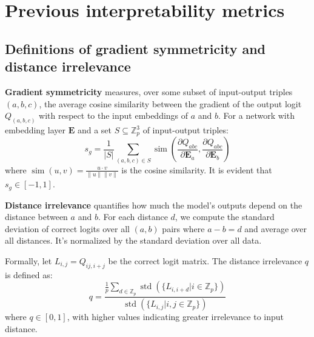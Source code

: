 \documentclass{article} %
\theoremstyle{plain}
\theoremstyle{definition}
\newtheorem{empirical fact}[theorem]{Empirical Fact}
\begin{document}
\section{Previous interpretability metrics \citep{zhong2023the}}\label{app:prev-metrics}

\subsection{Definitions of gradient symmetricity and distance irrelevance}

\textbf{Gradient symmetricity} measures, over some subset of input-output triples $(a,b,c)$, the average cosine similarity between the gradient of the output logit $Q_{(a,b,c)}$ with respect to the input embeddings of $a$ and $b$. For a network with embedding layer $\mathbf{E}$ and a set $S\subseteq \mathbb{Z}_p^3$ of input-output triples:
\[
    s_g = \frac{1}{|S|} \sum_{(a,b,c)\in S}\operatorname{sim}\left(\frac{\partial Q_{abc}}{\partial \mathbf{E}_a}, \frac{\partial Q_{abc}}{\partial\mathbf{E}_b}\right)
\]
where $\operatorname{sim}(u,v)=\frac{u\cdot v}{\| u \| \| v \|}$ is the cosine similarity. It is evident that $s_g\in [-1, 1]$. 

\textbf{Distance irrelevance} quantifies how much the model’s outputs depend on the distance between $a$ and $b$. For each distance $d$, we compute the standard deviation of correct logits over all $(a,b)$ pairs where $a-b=d$ and average over all distances. It's normalized by the standard deviation over all data.

Formally, let $L_{i,j}=Q_{ij, i+j}$ be the correct logit matrix. The distance irrelevance $q$ is defined as:
\[
    q= \frac{\frac{1}{p}\sum_{d\in \mathbb{Z}_p}\operatorname{std}(\{L_{i, i+d}|i\in \mathbb{Z}_p\})}{\operatorname{std}(\{L_{i, j}|i, j\in \mathbb{Z}_p\})}
\]
where $q\in [0,1]$, with higher values indicating greater irrelevance to input distance.
\end{document}
